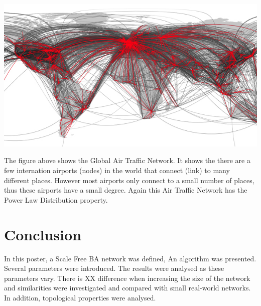 \documentclass[a0,final]{a0poster}
\begin{document}
\begin{multicols}{3}
\centerline{\includegraphics{airtraffic.jpg}}

The figure above shows the Global Air Traffic Network. It shows the there are a few internation airports (nodes) in the world that connect (link) to many different places. However most airports only connect to a small number of places, thus these airports have a small degree. Again this Air Traffic Network has the Power Law Distribution property.

\section*{Conclusion}
In this poster, a Scale Free BA network was defined, An algorithm was presented. Several parameters were introduced. The results were analysed as these parameters vary. There is XX difference when increasing the size of the network and similarities were investigated and compared with small real-world networks. In addition, topological properties were analysed. 




\end{multicols}
\end{document}

